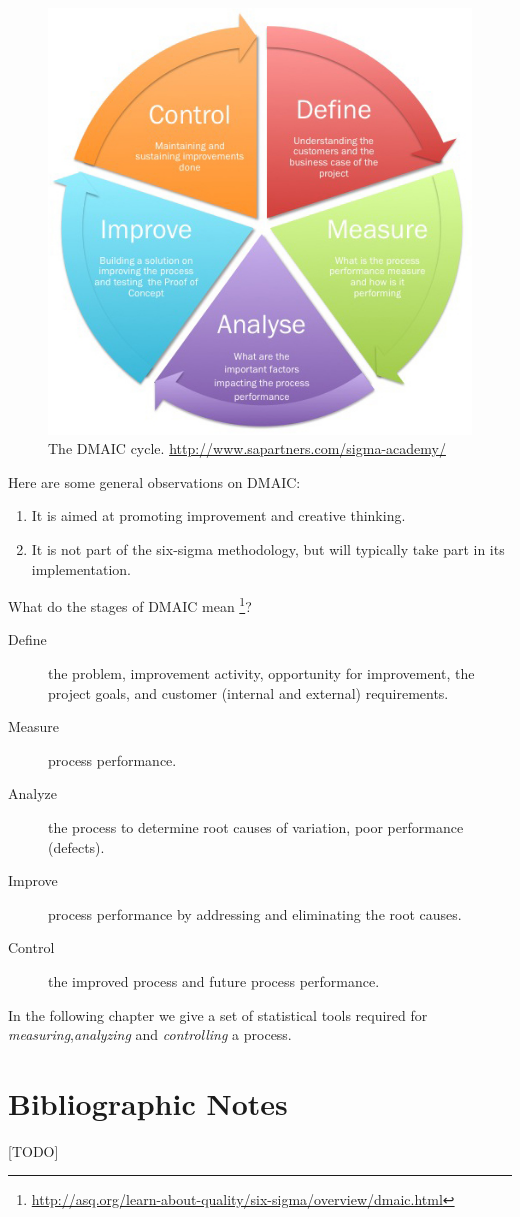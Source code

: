 \begin{figure}[t]
\centering
\includegraphics[width=0.6\linewidth]{art/Sigma_detail}
\caption[DMAIC]{The DMAIC cycle. \newline
\url{http://www.sapartners.com/sigma-academy/}}
\label{fig:DMAIC}
\end{figure}

Here are some general observations on DMAIC:
\begin{enumerate}
\item It is aimed at promoting improvement and creative thinking.
\item It is not part of the six-sigma methodology, but will typically take part in its implementation.
\end{enumerate}

What do the stages of DMAIC mean \footnote{\url{http://asq.org/learn-about-quality/six-sigma/overview/dmaic.html}}?
\begin{description}
\item [Define] the problem, improvement activity, opportunity for improvement, the project goals, and customer (internal and external) requirements.
\item [Measure] process performance.
\item [Analyze] the process to determine root causes of variation, poor performance (defects).
\item [Improve] process performance by addressing and eliminating the root causes.
\item [Control] the improved process and future process performance.
\end{description}

In the following chapter we give a set of statistical tools required for \emph{measuring},\emph{analyzing} and \emph{controlling} a process.




\section{Bibliographic Notes}
[TODO]